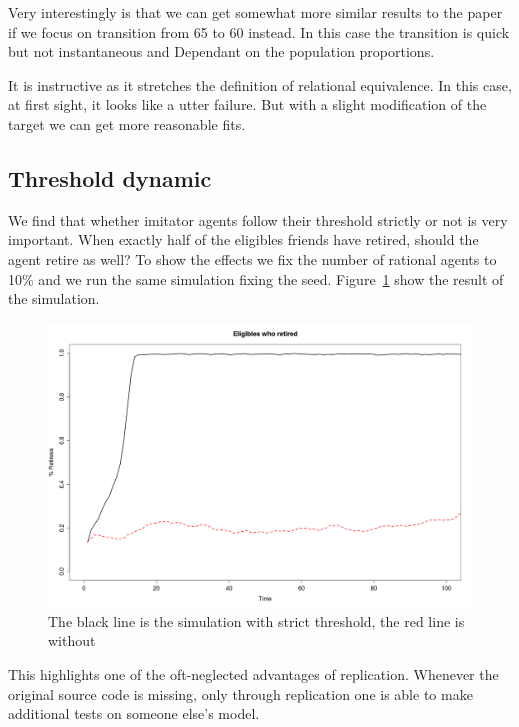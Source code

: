 \documentclass[runningheads,a4paper]{article}
\begin{document}
Very interestingly is that we can get somewhat more similar results to the paper if we focus on transition from 65 to 60 instead.
In this case the transition is quick but not instantaneous and Dependant on the population proportions.

It is instructive as it stretches the definition of relational equivalence.
In this case, at first sight, it looks like a utter failure.
But with a slight modification of the target we can get more reasonable fits.

\subsection{Threshold dynamic}

We find that whether imitator agents follow their threshold strictly or not is very important.
When exactly half of the eligibles friends have retired, should the agent retire as well?
To show the effects we fix the number of rational agents to 10\% and we run the same simulation fixing the seed.
Figure~\ref{laxstrict} show the result of the simulation.

\begin{figure}
 \begin{center}
  \includegraphics[scale=.30]{figs/laxstrict.png}
\caption{The black line is the simulation with strict threshold, the red line is without}
\label{laxstrict}
 \end{center}
\end{figure}

This highlights one of the oft-neglected advantages of replication.
Whenever the original source code is missing, only through replication one is able to make additional tests on someone else's model.
\end{document}
